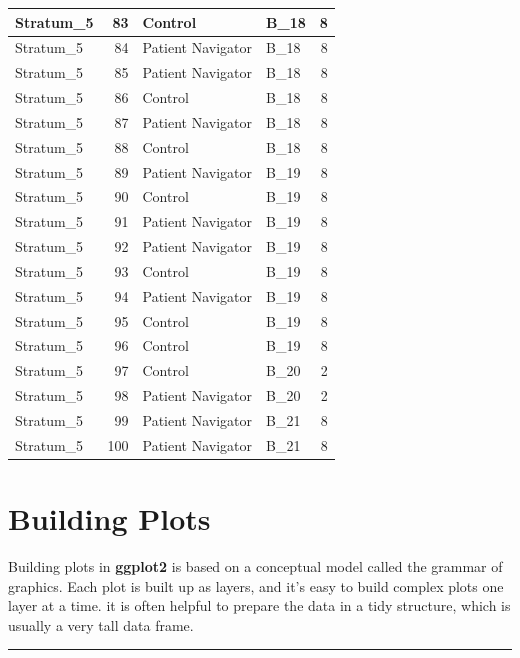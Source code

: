 \documentclass[
]{book}
\begin{document}
\begin{table}[H]
\begin{tabular}{l|r|l|l|r}
\hline
Stratum\_5 & 83 & Control & B\_18 & 8\\
\hline
Stratum\_5 & 84 & Patient Navigator & B\_18 & 8\\
\hline
Stratum\_5 & 85 & Patient Navigator & B\_18 & 8\\
\hline
Stratum\_5 & 86 & Control & B\_18 & 8\\
\hline
Stratum\_5 & 87 & Patient Navigator & B\_18 & 8\\
\hline
Stratum\_5 & 88 & Control & B\_18 & 8\\
\hline
Stratum\_5 & 89 & Patient Navigator & B\_19 & 8\\
\hline
Stratum\_5 & 90 & Control & B\_19 & 8\\
\hline
Stratum\_5 & 91 & Patient Navigator & B\_19 & 8\\
\hline
Stratum\_5 & 92 & Patient Navigator & B\_19 & 8\\
\hline
Stratum\_5 & 93 & Control & B\_19 & 8\\
\hline
Stratum\_5 & 94 & Patient Navigator & B\_19 & 8\\
\hline
Stratum\_5 & 95 & Control & B\_19 & 8\\
\hline
Stratum\_5 & 96 & Control & B\_19 & 8\\
\hline
Stratum\_5 & 97 & Control & B\_20 & 2\\
\hline
Stratum\_5 & 98 & Patient Navigator & B\_20 & 2\\
\hline
Stratum\_5 & 99 & Patient Navigator & B\_21 & 8\\
\hline
Stratum\_5 & 100 & Patient Navigator & B\_21 & 8\\
\hline
\end{tabular}
\end{table}

\hypertarget{building-plots}{%
\chapter{Building Plots}\label{building-plots}}

Building plots in \textbf{ggplot2} is based on a conceptual model called the grammar of graphics. Each plot is built up as layers, and it's easy to build complex plots one layer at a time. it is often helpful to prepare the data in a tidy structure, which is usually a very tall data frame.

\begin{center}\rule{0.5\linewidth}{0.5pt}\end{center}
\end{document}
